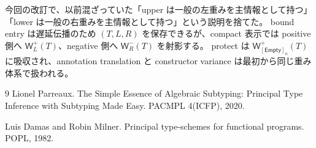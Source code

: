 \documentclass[uplatex,dvipdfmx,a4paper,10.5pt]{jsarticle}
\theoremstyle{jpplain}
\newcommand{\Empty}{\mathsf{Empty}}
\newcommand{\PWeight}[2]{\mathsf{W}^{+}_{#1}(#2)}
\newcommand{\NWeight}[2]{\mathsf{W}^{-}_{#1}(#2)}
\newcommand{\takeop}[2]{[#1]_{#2}}
\begin{document}
\begin{statusbox}
今回の改訂で、以前混ざっていた「upper は一般の左重みを主情報として持つ」「lower は一般の右重みを主情報として持つ」という説明を捨てた。
bound entry は遅延伝播のため $(T,L,R)$ を保存できるが、compact 表示では
positive 側へ $\PWeight{L}{T}$、negative 側へ $\NWeight{R}{T}$ を射影する。
protect は $\PWeight{\takeop{\Empty}{u}}{T}$ に吸収され、annotation translation と constructor variance は最初から同じ重み体系で扱われる。
\end{statusbox}

\begin{thebibliography}{9}
Lionel Parreaux.
\newblock The Simple Essence of Algebraic Subtyping: Principal Type Inference with Subtyping Made Easy.
\newblock PACMPL 4(ICFP), 2020.

Luis Damas and Robin Milner.
\newblock Principal type-schemes for functional programs.
\newblock POPL, 1982.
\end{thebibliography}
\end{document}
